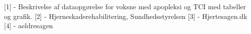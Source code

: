 
[1] - Beskrivelse af dataopgørelse for voksne med apopleksi og TCI med tabeller og grafik. 
[2] - Hjerneskaderehabilitering, Sundhedsstyrelsen
[3] - Hjertesagen.dk
[4] - aeldresagen

